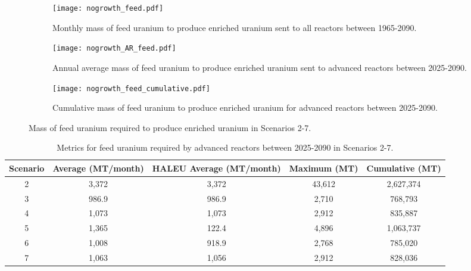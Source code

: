 \begin{figure}[h!]
    \centering
    \begin{subfigure}[b]{0.45\textwidth}
        \centering
        \texttt{[image: nogrowth\_feed.pdf]}
        \caption{Monthly mass of feed uranium to produce enriched uranium sent to 
        all reactors between 1965-2090.}
        \label{fig:nogrowth_all_feed}
    \end{subfigure}
    \hfill
    \begin{subfigure}[b]{0.45\textwidth}
        \centering
        \texttt{[image: nogrowth\_AR\_feed.pdf]}
        \caption{Annual average mass of feed uranium to produce enriched uranium sent to 
        advanced reactors between 2025-2090.}
        \label{fig:nogrowth_AR_feed}
    \end{subfigure}
    \begin{subfigure}[b]{0.45\textwidth}
        \centering
        \texttt{[image: nogrowth\_feed\_cumulative.pdf]}
        \caption{Cumulative mass of feed uranium to produce enriched 
        uranium for advanced reactors between 2025-2090.}
        \label{fig:nogrowth_feed_cumulative}
    \end{subfigure}
       \caption{Mass of feed uranium required to produce enriched uranium
        in Scenarios 2-7.}
       \label{fig:nogrowth_feed}
\end{figure}

\begin{table}[h!]
    \centering 
    \caption{Metrics for feed uranium required by advanced reactors 
    between 2025-2090 in Scenarios 2-7.}
    \label{tab:nogrowth_feed}
    \begin{tabular}{c c c c c}
        \hline
        Scenario & Average (MT/month) & \gls{HALEU} Average 
        (MT/month) & Maximum (MT) & Cumulative (MT)\\\hline
        2 & 3,372 & 3,372 & 43,612 & 2,627,374\\
        3 & 986.9 & 986.9 & 2,710 & 768,793\\
        4 & 1,073 & 1,073 & 2,912 & 835,887\\
        5 & 1,365 & 122.4 & 4,896 & 1,063,737\\
        6 & 1,008 & 918.9 & 2,768 & 785,020\\
        7 & 1,063 & 1,056 & 2,912 & 828,036\\
        \hline
    \end{tabular}
\end{table}

